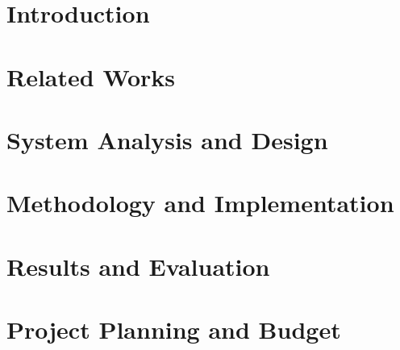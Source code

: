 \documentclass[12pt]{report}
\begin{document}
\renewcommand{\thepage}{\roman{page}}
\setcounter{page}{1}







\tableofcontents

\listoffigures

\listoftables

\clearpage
\setcounter{page}{1}
\setcounter{chapter}{0}
\renewcommand{\thepage}{\arabic{page}}
\setlength{\parskip}{0.45em}


\chapter{Introduction}
\label{cha:introduction}


\chapter{Related Works}
\label{cha:LiteratureReviewU}


\chapter{System Analysis and Design}
\label{cha:SystemAnalysisAndDesignU}


\chapter{Methodology and Implementation}
\label{cha:MethodologyAndImplementationU}


\chapter{Results and Evaluation}
\label{cha:ResultsAndEvaluationU}


\chapter{Project Planning and Budget}
\label{cha:cost_time}

\end{document}
